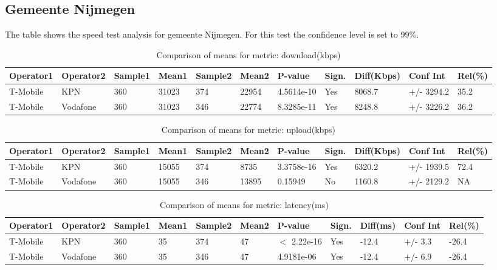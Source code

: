 \documentclass[]{article}
\begin{document}
\normalsize

\newpage

\subsection{Gemeente Nijmegen}\label{gemeente-nijmegen}

The table shows the speed test analysis for gemeente Nijmegen. For this
test the confidence level is set to 99\%.

\begin{table}[ht]
\centering
{\footnotesize
\begin{tabular}{lllllllllll}
  \hline
Operator1 & Operator2 & Sample1 & Mean1 & Sample2 & Mean2 & P-value & Sign. & Diff(Kbps) & Conf Int & Rel(\%) \\ 
  \hline
T-Mobile & KPN & 360 & 31023 & 374 & 22954 & 4.5614e-10 & Yes & 8068.7 & +/- 3294.2 & 35.2 \\ 
  T-Mobile & Vodafone & 360 & 31023 & 346 & 22774 & 8.3285e-11 & Yes & 8248.8 & +/- 3226.2 & 36.2 \\ 
   \hline
\end{tabular}
}
\caption{Comparison of means for metric: download(kbps)} 
\end{table}

\begin{table}[ht]
\centering
{\footnotesize
\begin{tabular}{lllllllllll}
  \hline
Operator1 & Operator2 & Sample1 & Mean1 & Sample2 & Mean2 & P-value & Sign. & Diff(Kbps) & Conf Int & Rel(\%) \\ 
  \hline
T-Mobile & KPN & 360 & 15055 & 374 & 8735 & 3.3758e-16 & Yes & 6320.2 & +/- 1939.5 & 72.4 \\ 
  T-Mobile & Vodafone & 360 & 15055 & 346 & 13895 & 0.15949 & No & 1160.8 & +/- 2129.2 & NA \\ 
   \hline
\end{tabular}
}
\caption{Comparison of means for metric: upload(kbps)} 
\end{table}

\begin{table}[ht]
\centering
{\footnotesize
\begin{tabular}{lllllllllll}
  \hline
Operator1 & Operator2 & Sample1 & Mean1 & Sample2 & Mean2 & P-value & Sign. & Diff(ms) & Conf Int & Rel(\%) \\ 
  \hline
T-Mobile & KPN & 360 & 35 & 374 & 47 & $<$ 2.22e-16 & Yes & -12.4 & +/- 3.3 & -26.4 \\ 
  T-Mobile & Vodafone & 360 & 35 & 346 & 47 & 4.9181e-06 & Yes & -12.4 & +/- 6.9 & -26.4 \\ 
   \hline
\end{tabular}
}
\caption{Comparison of means for metric: latency(ms)} 
\end{table}
\end{document}
